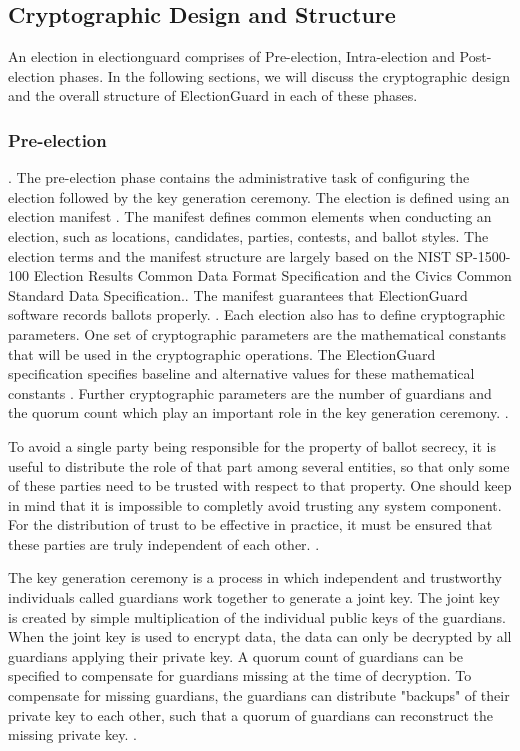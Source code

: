 \subsection{Cryptographic Design and Structure}
An election in electionguard comprises of Pre-election, Intra-election and Post-election phases. In the following sections, we will discuss the cryptographic design and the overall structure of ElectionGuard in each of these phases.

\subsubsection{Pre-election}. 
The pre-election phase contains the administrative task of configuring the election followed by the key generation ceremony. The election is defined using an election manifest \cite[7]{eg-paper}. The manifest defines common elements when conducting an election, such as locations, candidates, parties, contests, and ballot styles. The election terms and the manifest structure are largely based on the NIST SP-1500-100 Election Results Common Data Format Specification and the Civics Common Standard Data Specification.\cite{eg-docs}.  The manifest guarantees that ElectionGuard software records ballots properly. \cite[7]{eg-paper}. Each election also has to define cryptographic parameters. One set of cryptographic parameters are the mathematical constants that will be used in the cryptographic operations. The ElectionGuard specification specifies baseline and alternative values for these mathematical constants \cite[21, 36-38]{eg-spec}. Further cryptographic parameters are the number of guardians and the quorum count which play an important role in the key generation ceremony. \cite[8-9]{eg-paper}.

To avoid a single party being responsible for the property of ballot secrecy, it is useful to distribute the role of that part among several entities, so that only some of these parties need to be trusted with respect to that property. One should keep in mind that it is impossible to completly avoid trusting any system component. For the distribution of trust to be effective in practice, it must be ensured that these parties are truly independent of each other. \cite[92]{stuve-studys}.

The key generation ceremony is a process in which independent and trustworthy individuals called guardians work together to generate a joint key. The joint key is created by simple multiplication of the individual public keys of the guardians. When the joint key is used to encrypt data, the data can only be decrypted by all guardians applying their private key. A quorum count of guardians can be specified to compensate for guardians missing at the time of decryption. To compensate for missing guardians, the guardians can distribute "backups" of their private key to each other, such that a quorum of guardians can reconstruct the missing private key. \cite[8]{eg-paper} \cite{eg-docs}.


